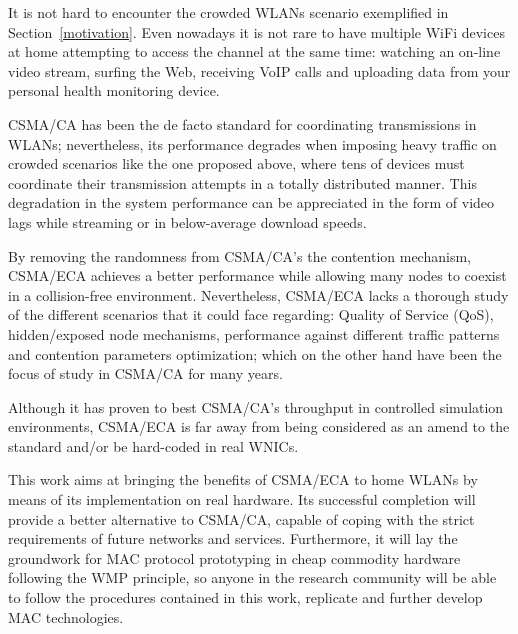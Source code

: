 It is not hard to encounter the crowded WLANs scenario exemplified in Section~\ref{motivation}. Even nowadays it is not rare to have multiple WiFi devices at home attempting to access the channel at the same time: watching an on-line video stream, surfing the Web, receiving VoIP calls and uploading data from your personal health monitoring device.

CSMA/CA has been the de facto standard for coordinating transmissions in WLANs; nevertheless, its performance degrades when imposing heavy traffic on crowded scenarios like the one proposed above, where tens of devices must coordinate their transmission attempts in a totally distributed manner. This degradation in the system performance can be appreciated in the form of video lags while streaming or in below-average download speeds.

By removing the randomness from CSMA/CA's the contention mechanism, CSMA/ECA achieves a better performance while allowing many nodes to coexist in a collision-free environment. Nevertheless, CSMA/ECA lacks a thorough study of the different scenarios that it could face regarding: Quality of Service (QoS), hidden/exposed node mechanisms, performance against different traffic patterns and contention parameters optimization; which on the other hand have been the focus of study in CSMA/CA for many years.

Although it has proven to best CSMA/CA's throughput in controlled simulation environments, CSMA/ECA is far away from being considered as an amend to the standard and/or be hard-coded in real WNICs.

This work aims at bringing the benefits of CSMA/ECA to home WLANs by means of its implementation on real hardware. Its successful completion will provide a better alternative to CSMA/CA, capable of coping with the strict requirements of future networks and services. Furthermore, it will lay the groundwork for MAC protocol prototyping in cheap commodity hardware following the WMP principle, so anyone in the research community will be able to follow the procedures contained in this work, replicate and further develop MAC technologies.